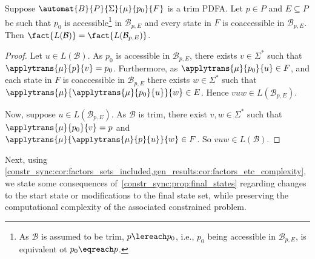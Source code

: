 \begin{proposition}
	\label{constr_sync:prop:final_states}
	Suppose $\automat{B}{P}{\Sigma}{\mu}{p_0}{F}$ is a trim PDFA. Let $p \in P$
	and $E \subseteq P$ be such that
	$p_0$ is accessible\footnote{As $\mathcal B$
		is assumed to be trim,  $p \lereach p_0$, i.e., $p_0$ being accessible in $\mathcal B_{p, E}$, is equivalent ot $p_0 \eqreach p$.}
	in $\mathcal B_{p, E}$
	and every state in $F$ is coaccessible in $\mathcal B_{p, E}$.
	Then $\fact{L(\mathcal B)} = \fact{L(\mathcal B_{p, E})}$.
\end{proposition}
\begin{proof} %
	Let $u \in L(\mathcal B)$. 
	As $p_0$ is accessible in $\mathcal B_{p, E}$,
	there exists $v \in \Sigma^*$ such that 	
	$\applytrans{\mu}{p}{v} = p_0$.
	Furthermore, as $\applytrans{\mu}{p_0}{u} \in F$,
	and each state in $F$ is coaccessible in $\mathcal B_{p,E}$ 
	there exists $w \in \Sigma^*$
	such that $\applytrans{\mu}{\applytrans{\mu}{p_0}{u}}{w} \in E$.
	Hence $vuw \in L(\mathcal B_{p, E})$.
	
	Now, suppose $u \in L(\mathcal B_{p, E})$.
	As $\mathcal B$ is trim,
	there exist $v, w \in \Sigma^*$
	such that $\applytrans{\mu}{p_0}{v} = p$
	and $\applytrans{\mu}{\applytrans{\mu}{p}{u}}{w} \in F$.
	So $vuw \in L(\mathcal B)$.
\end{proof}

Next, using \cref{constr_sync:cor:factors_sets_included,gen_results:cor:factors_etc_complexity}, we state some consequences of~\cref{constr_sync:prop:final_states} regarding changes to the start state or modifications to the final state set, while preserving the computational complexity of the associated constrained problem.

